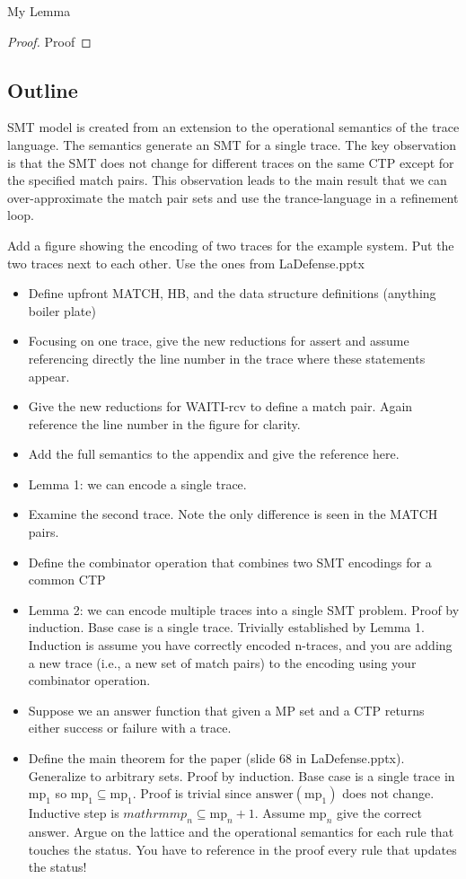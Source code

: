 \begin{theorem}
My Lemma
\end{theorem}
\begin{proof}
Proof
\end{proof}

\subsection{Outline}

SMT model is created from an extension to the operational semantics of the
trace language.  The semantics generate an SMT for a single trace.  The key
observation is that the SMT does not change for different traces on the same
CTP except for the specified match pairs.  This observation leads to the main
result that we can over-approximate the match pair sets and use the
trance-language in a refinement loop.

Add a figure showing the encoding of two traces for the example system.   Put the two traces next to each other.  Use the ones from LaDefense.pptx
\begin{itemize}
\item Define upfront MATCH, HB, and the data structure definitions (anything boiler plate)
\item Focusing on one trace, give the new reductions for assert and assume referencing directly the line number in the trace where these statements appear. 
\item Give the new reductions for WAITI-rcv to define a match pair.  Again reference the line number in the figure for clarity.  
\item Add the full semantics to the appendix and give the reference here.
\item Lemma 1: we can encode a single trace.  
\item Examine the second trace.  Note the only difference is seen in the MATCH pairs.
\item Define the combinator operation that combines two SMT encodings for a common CTP
\item Lemma 2: we can encode multiple traces into a single SMT problem.  Proof by induction.  Base case is a single trace.  Trivially established by Lemma 1.  Induction is assume you have correctly encoded n-traces, and you are adding a new trace (i.e., a new set of match pairs) to the encoding using your combinator operation.  
\item Suppose we an answer function that given a MP set and a CTP returns either success or failure with a trace.  
\item Define the main theorem for the paper (slide 68 in LaDefense.pptx).  Generalize to arbitrary sets.  Proof by induction.  Base case is a single trace in $\mathrm{mp}_1$ so $\mathrm{mp}_1 \subseteq \mathrm{mp}_1$.  Proof is trivial since $\mathrm{answer}(\mathrm{mp}_1)$ does not change.  Inductive step is $mathrm{mp}_n \subseteq \mathrm{mp}_n+1$.   Assume $\mathrm{mp}_n$ give the correct answer.  Argue on the lattice and the operational semantics for each rule that touches the status.  You have to reference in the proof every rule that updates the status!
\end{itemize}



